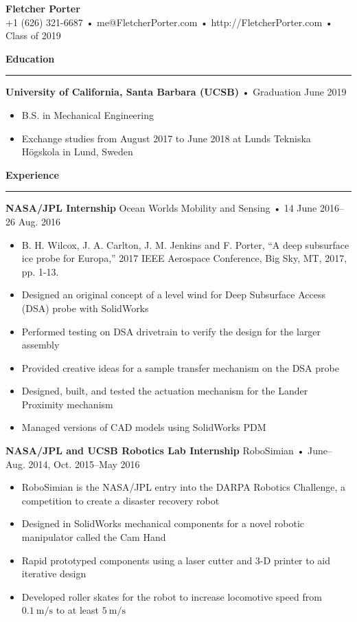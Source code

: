 \documentclass[12pt, oneside]{article}
\newcommand{\titlestyle}[1] {
	{\fontsize{50pt}{1em}\selectfont \bf \textcolor{new_red}{#1}} \\
}
\newcommand{\headingstyleJobs}[1] {
	{\fontsize{20pt}{1em}\selectfont \bf \textcolor{new_red}{#1}}
	\textcolor{new_red}{\rule{3.25in}{0.5pt}} \vspace{3pt}
}
\newcommand{\infostyle}[1] {
	{\fontsize{9pt}{1em}\selectfont #1} \\ \vspace{10pt}
}
\newcommand{\jobtitle}[3] {
	{\bf #1} {#2} • {#3} \vspace{-10pt} \\
}
\begin{document}
\begin{flushleft}


\titlestyle{Fletcher Porter}
\infostyle{+1 (626) 321-6687 • me@FletcherPorter.com • http://FletcherPorter.com • Class of 2019}


\headingstyleJobs{Education}

\jobtitle{University of California, Santa Barbara (UCSB)}{}{Graduation June 2019}
\begin{itemize}
	\item B.S. in Mechanical Engineering
	\item Exchange studies from August 2017 to June 2018 at Lunds Tekniska Högskola in Lund, Sweden
\end{itemize}


\headingstyleJobs{Experience}

\jobtitle{NASA/JPL Internship}{Ocean Worlds Mobility and Sensing}{14 June 2016–26 Aug. 2016}
\def\HrefFont{\em}
\begin{itemize}
	\item B. H. Wilcox, J. A. Carlton, J. M. Jenkins and F. Porter, ``A deep subsurface ice probe for Europa,'' 2017 IEEE Aerospace Conference, Big Sky, MT, 2017, pp. 1-13.
	\item Designed an original concept of a level wind for Deep Subsurface Access (DSA) probe with SolidWorks
	\item Performed testing on DSA drivetrain to verify the design for the larger assembly
	\item Provided creative ideas for a sample transfer mechanism on the DSA probe
	\item Designed, built, and tested the actuation mechanism for the Lander Proximity mechanism
	\item Managed versions of CAD models using SolidWorks PDM
\end{itemize}

\jobtitle{NASA/JPL and UCSB Robotics Lab Internship}{RoboSimian}{June–Aug. 2014, Oct. 2015–May 2016}
\begin{itemize}
	\item RoboSimian is the NASA/JPL entry into the DARPA Robotics Challenge, a competition to create a disaster recovery robot
	\item Designed in SolidWorks mechanical components for a novel robotic manipulator called the Cam Hand
	\item Rapid prototyped components using a laser cutter and 3-D printer to aid iterative design
	\item Developed roller skates for the robot to increase locomotive speed from $\SI{0.1}{\meter\per\second}$ to at least $\SI{5}{\meter\per\second}$
\end{itemize}



\end{flushleft}
\end{document}
